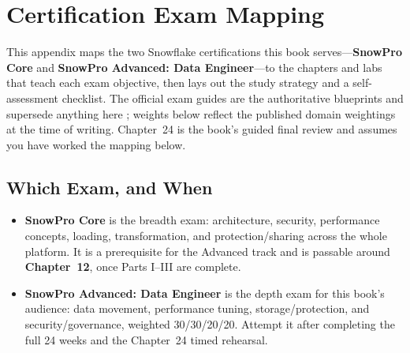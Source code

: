\chapter{Certification Exam Mapping}
%
This appendix maps the two Snowflake certifications this book serves---\textbf{SnowPro Core}
and \textbf{SnowPro Advanced: Data Engineer}---to the chapters and labs that teach each exam
objective, then lays out the study strategy and a self-assessment checklist. The official exam
guides are the authoritative blueprints and supersede anything here \cite{snowproExamGuide};
weights below reflect the published domain weightings at the time of writing. Chapter~24 is the
book's guided final review and assumes you have worked the mapping below.

\section{Which Exam, and When}
\begin{itemize}
    \item \textbf{SnowPro Core} is the breadth exam: architecture, security, performance
    concepts, loading, transformation, and protection/sharing across the whole platform. It is
    a prerequisite for the Advanced track and is passable around \textbf{Chapter~12}, once
    Parts I--III are complete.
    \item \textbf{SnowPro Advanced: Data Engineer} is the depth exam for this book's audience:
    data movement, performance tuning, storage/protection, and security/governance, weighted
    30/30/20/20. Attempt it after completing the full 24 weeks and the Chapter~24 timed
    rehearsal.
\end{itemize}

